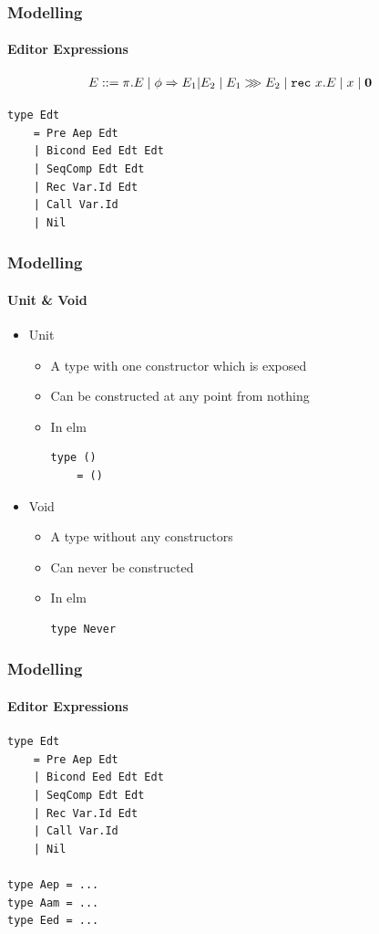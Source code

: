 \documentclass{beamer}
\begin{document}
\begin{frame}[fragile]
    \frametitle{Modelling}
    \framesubtitle{Editor Expressions}

    \begin{definition}
        \begin{align*}
            E &::= \pi.E \mid \phi \Rightarrow E_1|E_2 \mid E_1 \ggg E_2 \mid \texttt{rec}~x.E \mid x \mid \mathbf{0}
        \end{align*}
    \end{definition}

\begin{lstlisting}
type Edt
    = Pre Aep Edt
    | Bicond Eed Edt Edt
    | SeqComp Edt Edt
    | Rec Var.Id Edt
    | Call Var.Id
    | Nil
\end{lstlisting}
\end{frame}

\begin{frame}[fragile]
    \frametitle{Modelling}
    \framesubtitle{Unit \& Void}

    \begin{itemize}
        \item Unit
        \begin{itemize}
            \item A type with one constructor which is exposed
            \item Can be constructed at any point from nothing
            \item In elm
\begin{lstlisting}
type ()
    = ()
\end{lstlisting}
        \pause

        \end{itemize}
        \item Void
        \begin{itemize}
            \item A type without any constructors
            \item Can never be constructed
            \item In elm
\begin{lstlisting}
type Never
\end{lstlisting}
        \end{itemize}
    \end{itemize}
\end{frame}

\begin{frame}[fragile]
    \frametitle{Modelling}
    \framesubtitle{Editor Expressions}

\begin{lstlisting}
type Edt
    = Pre Aep Edt
    | Bicond Eed Edt Edt
    | SeqComp Edt Edt
    | Rec Var.Id Edt
    | Call Var.Id
    | Nil

type Aep = ...
type Aam = ...
type Eed = ...
\end{lstlisting}
\end{frame}
\end{document}
